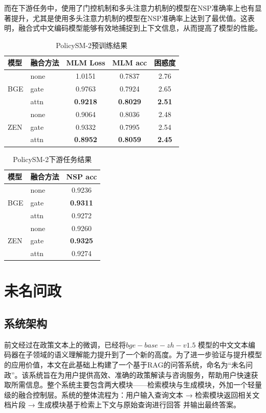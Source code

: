 \documentclass[12pt, a4paper]{ctexart}
\begin{document}
而在下游任务中，使用了门控机制和多头注意力机制的模型在NSP准确率上也有显著提升，尤其是使用多头注意力机制的模型在NSP准确率上达到了最优值。这表明，融合式中文编码模型能够有效地捕捉到上下文信息，从而提高了模型的性能。

\begin{table}[htbp]
    \centering
    \begin{tabular}{llccc}
      \toprule
      模型 & 融合方法 & MLM Loss & MLM acc & 困惑度 \\
      \midrule
      \multirow{3}{*}{BGE}
        & none & 1.0151 & 0.7837 & 2.76 \\
        & gate & 0.9763 & 0.7924 & 2.65 \\
        & attn & \textbf{0.9218} & \textbf{0.8029} & \textbf{2.51} \\
      \midrule
      \multirow{3}{*}{ZEN}
        & none & 0.9064 & 0.8036 & 2.48 \\
        & gate & 0.9332 & 0.7995 & 2.54 \\
        & attn & \textbf{0.8952} & \textbf{0.8059} & \textbf{2.45} \\
      \bottomrule
    \end{tabular}
    \caption{PolicySM-2预训练结果}
    \label{tab:pretrain-results}
  \end{table}
  
  \begin{table}[htbp]
    \centering
    \begin{tabular}{llc}
      \toprule
      模型 & 融合方法 & NSP acc \\
      \midrule
      \multirow{3}{*}{BGE}
        & none & 0.9236 \\
        & gate & \textbf{0.9311} \\
        & attn & 0.9272 \\
      \midrule
      \multirow{3}{*}{ZEN}
        & none & 0.9260 \\
        & gate & \textbf{0.9325} \\
        & attn & 0.9274 \\
      \bottomrule
    \end{tabular}
    \caption{PolicySM-2下游任务结果}
    \label{tab:nsp-results}
  \end{table}


\section{未名问政}
\subsection{系统架构}
前文经过在政策文本上的微调，已经将$ bge-base-zh-v1.5$ 模型的中文文本编码器在子领域的语义理解能力提升到了一个新的高度。为了进一步验证与提升模型的应用价值，本文在此基础上构建了一个基于RAG的问答系统，命名为“未名问政”。该系统旨在为用户提供高效、准确的政策解读与咨询服务，帮助用户快速获取所需信息。整个系统主要包含两大模块——检索模块与生成模块，外加一个轻量级的融合控制层。系统的整体流程为：用户输入查询文本 → 检索模块返回相关文档片段 → 生成模块基于检索上下文与原始查询进行回答 并输出最终答案。
\end{document}

